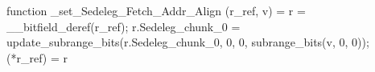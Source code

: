 function _set_Sedeleg_Fetch_Addr_Align (r_ref, v) = {
    r = __bitfield_deref(r_ref);
    r.Sedeleg_chunk_0 = update_subrange_bits(r.Sedeleg_chunk_0, 0, 0, subrange_bits(v, 0, 0));
    (*r_ref) = r
}
